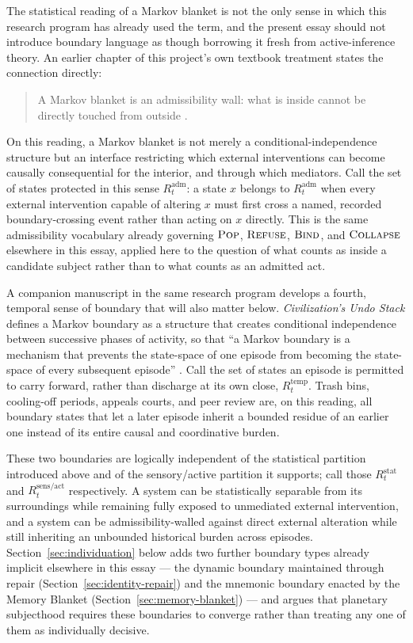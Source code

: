 \documentclass[11pt]{article}
\newcommand{\Pop}{\textsc{Pop}}
\newcommand{\Refuse}{\textsc{Refuse}}
\newcommand{\Bind}{\textsc{Bind}}
\newcommand{\Collapse}{\textsc{Collapse}}
\begin{document}
The statistical reading of a Markov blanket is not the only sense in which this research program has already used the term, and the present essay should not introduce boundary language as though borrowing it fresh from active-inference theory. An earlier chapter of this project's own textbook treatment states the connection directly:

\begin{quote}
A Markov blanket is an admissibility wall: what is inside cannot be directly touched from outside \cite{flyxionCPR}.
\end{quote}

\noindent On this reading, a Markov blanket is not merely a conditional-independence structure but an interface restricting which external interventions can become causally consequential for the interior, and through which mediators. Call the set of states protected in this sense $R^{\mathrm{adm}}_t$: a state $x$ belongs to $R^{\mathrm{adm}}_t$ when every external intervention capable of altering $x$ must first cross a named, recorded boundary-crossing event rather than acting on $x$ directly. This is the same admissibility vocabulary already governing $\Pop$, $\Refuse$, $\Bind$, and $\Collapse$ elsewhere in this essay, applied here to the question of what counts as inside a candidate subject rather than to what counts as an admitted act.

A companion manuscript in the same research program develops a fourth, temporal sense of boundary that will also matter below. \emph{Civilization's Undo Stack} defines a Markov boundary as a structure that creates conditional independence between successive phases of activity, so that ``a Markov boundary is a mechanism that prevents the state-space of one episode from becoming the state-space of every subsequent episode'' \cite{flyxionUndoStack}. Call the set of states an episode is permitted to carry forward, rather than discharge at its own close, $R^{\mathrm{temp}}_t$. Trash bins, cooling-off periods, appeals courts, and peer review are, on this reading, all boundary states that let a later episode inherit a bounded residue of an earlier one instead of its entire causal and coordinative burden.

These two boundaries are logically independent of the statistical partition introduced above and of the sensory/active partition it supports; call those $R^{\mathrm{stat}}_t$ and $R^{\mathrm{sens/act}}_t$ respectively. A system can be statistically separable from its surroundings while remaining fully exposed to unmediated external intervention, and a system can be admissibility-walled against direct external alteration while still inheriting an unbounded historical burden across episodes. Section~\ref{sec:individuation} below adds two further boundary types already implicit elsewhere in this essay --- the dynamic boundary maintained through repair (Section~\ref{sec:identity-repair}) and the mnemonic boundary enacted by the Memory Blanket (Section~\ref{sec:memory-blanket}) --- and argues that planetary subjecthood requires these boundaries to converge rather than treating any one of them as individually decisive.
\end{document}
